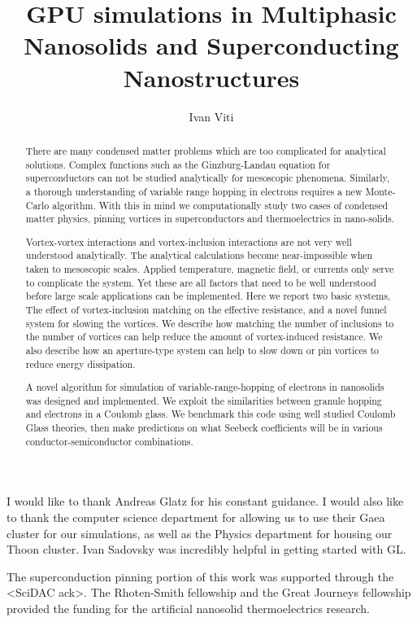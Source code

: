 \documentclass[12pt]{niuthesis}
\begin{document}
\title{GPU simulations in Multiphasic Nanosolids and Superconducting Nanostructures}

\author{Ivan Viti}


\begin{abstract}
There are many condensed matter problems which are too complicated for analytical solutions. Complex functions such as the Ginzburg-Landau equation for superconductors can not be studied analytically for mesoscopic phenomena. Similarly, a thorough understanding of variable range hopping in electrons requires a new Monte-Carlo algorithm. With this in mind we computationally study two cases of condensed matter physics, pinning vortices in superconductors and thermoelectrics in nano-solids.

        Vortex-vortex interactions and vortex-inclusion interactions are not very well understood analytically. The analytical calculations become near-impossible when taken to mesoscopic scales. Applied temperature, magnetic field, or currents only serve to complicate the system. Yet these are all factors that need to be well understood before large scale applications can be implemented. Here we report two basic systems, The effect of vortex-inclusion matching on the effective resistance, and a novel funnel system for slowing the vortices. We describe how matching the number of inclusions to the number of vortices can help reduce the amount of vortex-induced resistance. We also describe how an aperture-type system can help to slow down or pin vortices to reduce energy dissipation.

	A novel algorithm for simulation of variable-range-hopping of electrons in nanosolids was designed and implemented. We exploit the similarities between granule hopping and electrons in a Coulomb glass. We benchmark this code using well studied Coulomb Glass theories, then make predictions on what Seebeck coefficients will be in various conductor-semiconductor combinations.


\end{abstract}

\begin{acknowledgments}
  I would like to thank Andreas Glatz for his constant guidance. I would also like to thank the computer science department for allowing us to use their Gaea cluster for our simulations, as well as the Physics department for housing our Thoon cluster. Ivan Sadovsky was incredibly helpful in getting started with GL.
  
  The superconduction pinning portion of this work was supported through the <SciDAC ack>. The Rhoten-Smith fellowship and the Great Journeys fellowship provided the funding for the artificial nanosolid thermoelectrics research. 
\end{acknowledgments}
\end{document}
